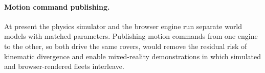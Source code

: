 \paragraph{Motion command publishing.}
At present the physics simulator and the browser engine run separate world
models with matched parameters. Publishing motion commands from one engine
to the other, so both drive the same rovers, would remove the residual
risk of kinematic divergence and enable mixed-reality demonstrations in
which simulated and browser-rendered fleets interleave.
